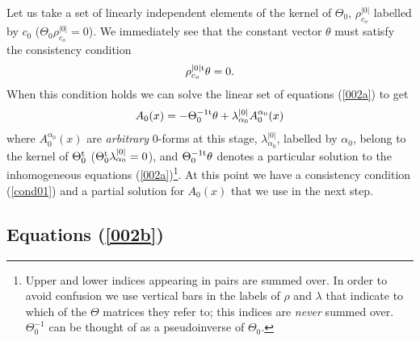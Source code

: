\documentclass[prd,a4paper,twocolumn,amssymb,amsmath,nofootinbib,showpacs]{revtex4}
\begin{document}
Let us take a set of linearly independent elements of the kernel
of $\Theta_0$, $\rho_{c_o}^{|0|}$ labelled by $c_0$
($\Theta_0\rho_{c_o}^{|0|}=0$). We immediately see that the
constant vector $\theta$ must satisfy the consistency condition
\begin{equation}
\rho_{c_o}^{|0|\rm{t}}\theta=0\label{cond01}.
\end{equation} When this
condition holds we can solve the linear set of equations
(\ref{002a}) to get
\begin{equation}
A_0(x)=-\Theta_0^{-1\rm{t}}\theta+
\lambda_{\alpha_0}^{|0|}A_0^{\alpha_0}(x)\label{cond02}
\end{equation}
where $A_0^{\alpha_0}(x)$ are \emph{arbitrary} 0-forms at this
stage, $\lambda_{\alpha_0}^{|0|}$, labelled by $\alpha_0$, belong
to the kernel of $\Theta_0^{\rm{t}}$
($\Theta_0^{\rm{t}}\lambda_{\alpha_0}^{|0|}=0$), and
$\Theta_0^{-1\rm{t}}\theta$ denotes a particular solution to the
inhomogeneous equations (\ref{002a})\footnote{Upper and lower
indices appearing in pairs are summed over. In order to avoid
confusion we use vertical bars in the labels of $\rho$ and
$\lambda$ that indicate to which of the $\Theta$ matrices they
refer to; this indices are \emph{never} summed over.
$\Theta_0^{-1}$ can be thought of as a pseudoinverse of
$\Theta_0$.}. At this point we have a consistency condition
(\ref{cond01}) and a partial solution for $A_0(x)$ that we use in
the next step.

\subsection{\label{Eq2} Equations (\ref{002b})}
\end{document}
